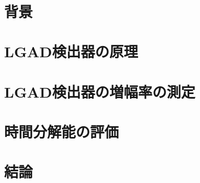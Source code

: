 \documentclass[uplatex]{jsbook}
\begin{document}
\frontmatter

\newpage
\thispagestyle{empty}
~
\newpage

\thispagestyle{empty}

\pagestyle{headings}
\setcounter{tocdepth}{2}
\tableofcontents
\listoffigures
\listoftables

\mainmatter

  \chapter{背景}
  
  
  
 
  \chapter{LGAD検出器の原理}
  
  
  \chapter{LGAD検出器の増幅率の測定}
  
  

 \chapter{時間分解能の評価}
 
 \chapter{結論}
 

 

\end{document}
